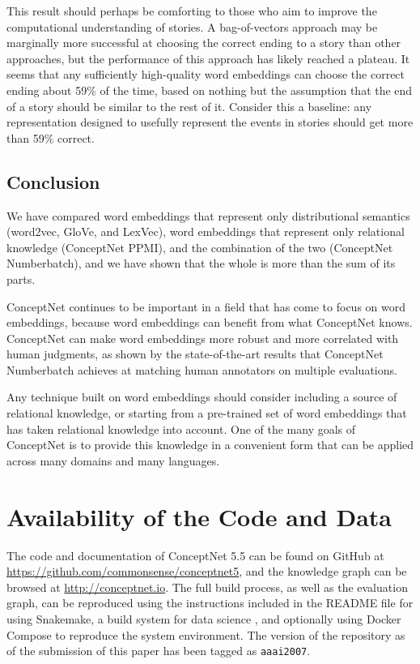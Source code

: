\documentclass[letterpaper]{article}
\begin{document}
This result should perhaps be comforting to those who aim to improve the
computational understanding of stories. A bag-of-vectors approach may be
marginally more successful at choosing the correct ending to a story than other
approaches, but the performance of this approach has likely reached a plateau.
It seems that any sufficiently high-quality word embeddings can choose the
correct ending about 59\% of the time, based on nothing but the assumption that
the end of a story should be similar to the rest of it. Consider this a
baseline: any representation designed to usefully represent the events in
stories should get more than 59\% correct.

\subsection{Conclusion}

We have compared word embeddings that represent only distributional semantics
(word2vec, GloVe, and LexVec), word embeddings that represent only
relational knowledge (ConceptNet PPMI), and the combination of the two
(ConceptNet Numberbatch), and we have shown that the whole is more than the sum
of its parts.

ConceptNet continues to be important in a field that has come to focus on word
embeddings, because word embeddings can benefit from what ConceptNet knows.
ConceptNet can make word embeddings more robust and more correlated with human
judgments, as shown by the state-of-the-art results that ConceptNet Numberbatch
achieves at matching human annotators on multiple evaluations.

Any technique built on word embeddings should
consider including a source of relational knowledge, or starting from a
pre-trained set of word embeddings that has taken relational knowledge into
account. One of the many goals of ConceptNet is to provide this knowledge in a
convenient form that can be applied across many domains and many languages.

\section{Availability of the Code and Data}

The code and documentation of ConceptNet 5.5 can be found on GitHub at
\url{https://github.com/commonsense/conceptnet5}, and the knowledge graph can
be browsed at \url{http://conceptnet.io}.  The full build process, as well as
the evaluation graph, can be reproduced using the instructions included in the
README file for using Snakemake, a build system for data science
\cite{koster2012snakemake}, and optionally using Docker Compose to reproduce
the system environment.  The version of the repository as of the submission of
this paper has been tagged as {\tt aaai2007}.
\end{document}
